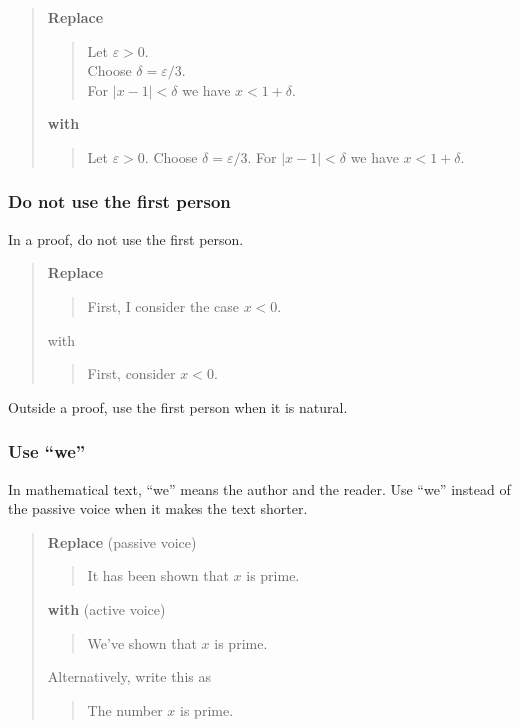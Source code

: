 \documentclass[12pt]{article}
\newcounter{ex}\setcounter{ex}{0}
\newcounter{id}\setcounter{id}{0}
\newcounter{se}\setcounter{se}{0}
\begin{document}
\begin{quote}
\textbf{Replace}
\begin{quote}
\begin{centering}
Let \(\varepsilon > 0\). \\
Choose \(\delta = \varepsilon / 3 \). \\
For \(|x - 1| < \delta \) we have \(x < 1 + \delta\). \\
\end{centering}
\end{quote}
\textbf{with}
\begin{quote}
Let \(\varepsilon > 0\).  Choose \(\delta = \varepsilon / 3 \).
For \(|x - 1| < \delta \) we have \mbox{\(x<1 + \delta\)}.
\end{quote}
\end{quote}






\subsubsection{Do not use the first person} 

In a proof, do not  use the first person.  

\begin{quote}
\textbf{Replace}
\begin{quote}
First, I consider the case \(x < 0\).
\end{quote}
with
\begin{quote}
 First, consider \(x < 0\).
\end{quote}
\end{quote}

Outside a proof, use the first person when it is natural.

 \subsubsection{  Use ``we''}

In mathematical text, ``we'' means the author and the reader.
Use ``we'' instead of the passive voice when it makes the 
text shorter.

\begin{quote}
\textbf{Replace} (passive voice)
\begin{quote}
  It has been shown that \(x\) is prime.
\end{quote}
\textbf{with} (active voice)
\begin{quote}
  We've shown that \(x\) is prime.
\end{quote}
Alternatively, write this as
\begin{quote}
  The number \(x\) is prime.
\end{quote}
\end{quote}
\end{document}
